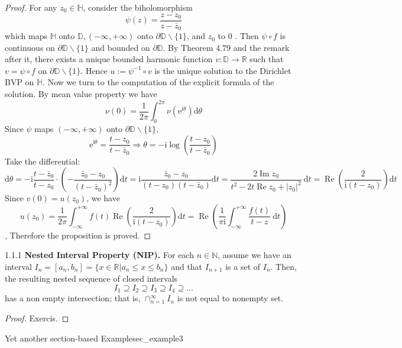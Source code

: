 \documentclass[11pt, a3paper, openany]{article}
\theoremstyle{remark}
\theoremstyle{remark}
\theoremstyle{remark}
\newenvironment{Proof of claim}
  {\begin{proof}[\normalfont \textbf{Proof of claim}]}
  {\end{proof}}
\begin{document}
\begin{proof}
    For any $z_0 \in \mathbb{H}$, consider the biholomorphism
    $$
    \psi(z)=\frac{z-z_0}{z-\bar{z}_0}
    $$
    which maps $\mathbb{H}$ onto $\mathbb{D},(-\infty,+\infty)$ onto $\partial \mathbb{D} \backslash\{1\}$, and $z_0$ to 0 . Then $\psi \circ f$ is continuous on $\partial \mathbb{D} \backslash\{1\}$ and bounded on $\partial \mathbb{D}$. By Theorem 4.79 and the remark after it, there exists a unique bounded harmonic function $v: \mathbb{D} \rightarrow \mathbb{R}$ such that $v=\psi \circ f$ on $\partial \mathbb{D} \backslash\{1\}$. Hence $u:=\psi^{-1} \circ v$ is the unique solution to the Dirichlet BVP on $\mathbb{H}$.
    Now we turn to the computation of the explicit formula of the solution. By mean value property we have
    $$
    \nu(0)=\frac{1}{2 \pi} \int_0^{2 \pi} \nu\left(\mathrm{e}^{\mathrm{i} \theta}\right) \mathrm{d} \theta
    $$
    Since $\psi$ maps $(-\infty,+\infty)$ onto $\partial \mathbb{D} \backslash\{1\}$,
    $$
    \mathrm{e}^{\mathrm{i} \theta}=\frac{t-z_0}{t-\bar{z}_0} \Rightarrow \theta=-\mathrm{i} \log \left(\frac{t-z_0}{t-\bar{z}_0}\right)
    $$
    Take the differential:
    $$
    \mathrm{d} \theta=-\mathrm{i} \frac{t-\bar{z}_0}{t-z_0} \cdot\left(-\frac{\bar{z}_0-z_0}{\left(t-\bar{z}_0\right)^2}\right) \mathrm{d} t=\mathrm{i} \frac{\bar{z}_0-z_0}{\left(t-z_0\right)\left(t-\bar{z}_0\right)} \mathrm{d} t=\frac{2 \operatorname{Im} z_0}{t^2-2 t \operatorname{Re} z_0+\left|z_0\right|^2} \mathrm{~d} t=\operatorname{Re}\left(\frac{2}{\mathrm{i}\left(t-z_0\right)}\right) \mathrm{d} t
    $$
    Since $v(0)=u\left(z_0\right)$, we have
    $$
    u\left(z_0\right)=\frac{1}{2 \pi} \int_{-\infty}^{+\infty} f(t) \operatorname{Re}\left(\frac{2}{\mathrm{i}\left(t-z_0\right)}\right) \mathrm{d} t=\operatorname{Re}\left(\frac{1}{\pi \mathrm{i}} \int_{-\infty}^{+\infty} \frac{f(t)}{t-z} \mathrm{~d} t\right)
    $$, Therefore the proposition is proved.

\end{proof}
\begin{theorem}{1.1.1}{}
\textbf{Nested Interval Property (NIP).} For each $n\in \mathbb{N}$, assume we have an interval $I_{n}=[a_{n}, b_{n}]=\{x \in \mathbb{R}|a_{n} \leq x \leq b_{n}\}$ and that $I_{n+1}$ is a set of $I_{n}$. Then, the resulting nested sequence of closed intervals
\begin{equation*}
    I_1 \supseteq I_2 \supseteq I_3 \supseteq I_4 \supseteq ...
\end{equation*}
has a non empty intersection; that is, $\cap_{n=1}^{\infty} I_{n}$ is not equal to nonempty set.
\end{theorem}
\begin{proof}
    Exercis.
\end{proof}
\begin{Example}{Yet another section-based Example}{sec_example3}
\end{Example}
\end{document}
